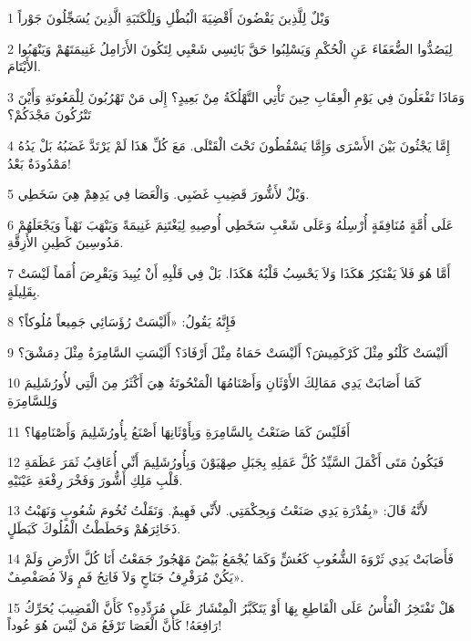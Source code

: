 \par 1 وَيْلٌ لِلَّذِينَ يَقْضُونَ أَقْضِيَةَ الْبُطْلِ وَلِلْكَتَبَةِ الَّذِينَ يُسَجِّلُونَ جَوْراً
\par 2 لِيَصُدُّوا الضُّعَفَاءَ عَنِ الْحُكْمِ وَيَسْلِبُوا حَقَّ بَائِسِي شَعْبِي لِتَكُونَ الأَرَامِلُ غَنِيمَتَهُمْ وَيَنْهَبُوا الأَيْتَامَ.
\par 3 وَمَاذَا تَفْعَلُونَ فِي يَوْمِ الْعِقَابِ حِينَ تَأْتِي التَّهْلُكَةُ مِنْ بَعِيدٍ؟ إِلَى مَنْ تَهْرُبُونَ لِلْمَعُونَةِ وَأَيْنَ تَتْرُكُونَ مَجْدَكُمْ؟
\par 4 إِمَّا يَجْثُونَ بَيْنَ الأَسْرَى وَإِمَّا يَسْقُطُونَ تَحْتَ الْقَتْلَى. مَعَ كُلِّ هَذَا لَمْ يَرْتَدَّ غَضَبُهُ بَلْ يَدُهُ مَمْدُودَةٌ بَعْدُ!
\par 5 وَيْلٌ لأَشُّورَ قَضِيبِ غَضَبِي. وَالْعَصَا فِي يَدِهِمْ هِيَ سَخَطِي.
\par 6 عَلَى أُمَّةٍ مُنَافِقَةٍ أُرْسِلُهُ وَعَلَى شَعْبِ سَخَطِي أُوصِيهِ لِيَغْتَنِمَ غَنِيمَةً وَيَنْهَبَ نَهْباً وَيَجْعَلَهُمْ مَدُوسِينَ كَطِينِ الأَزِقَّةِ.
\par 7 أَمَّا هُوَ فَلاَ يَفْتَكِرُ هَكَذَا وَلاَ يَحْسِبُ قَلْبُهُ هَكَذَا. بَلْ فِي قَلْبِهِ أَنْ يُبِيدَ وَيَقْرِضَ أُمَماً لَيْسَتْ بِقَلِيلَةٍ.
\par 8 فَإِنَّهُ يَقُولُ: «أَلَيْسَتْ رُؤَسَائِي جَمِيعاً مُلُوكاً؟
\par 9 أَلَيْسَتْ كَلْنُو مِثْلَ كَرْكَمِيشَ؟ أَلَيْسَتْ حَمَاةُ مِثْلَ أَرْفَادَ؟ أَلَيْسَتِ السَّامِرَةُ مِثْلَ دِمَشْقَ؟
\par 10 كَمَا أَصَابَتْ يَدِي مَمَالِكَ الأَوْثَانِ وَأَصْنَامُهَا الْمَنْحُوتَةُ هِيَ أَكْثَرُ مِنَ الَّتِي لأُورُشَلِيمَ وَلِلسَّامِرَةِ
\par 11 أَفَلَيْسَ كَمَا صَنَعْتُ بِالسَّامِرَةِ وَبِأَوْثَانِهَا أَصْنَعُ بِأُورُشَلِيمَ وَأَصْنَامِهَا؟
\par 12 فَيَكُونُ مَتَى أَكْمَلَ السَّيِّدُ كُلَّ عَمَلِهِ بِجَبَلِ صِهْيَوْنَ وَبِأُورُشَلِيمَ أَنِّي أُعَاقِبُ ثَمَرَ عَظَمَةِ قَلْبِ مَلِكِ أَشُّورَ وَفَخْرَ رِفْعَةِ عَيْنَيْهِ.
\par 13 لأَنَّهُ قَالَ: «بِقُدْرَةِ يَدِي صَنَعْتُ وَبِحِكْمَتِي. لأَنِّي فَهِيمٌ. وَنَقَلْتُ تُخُومَ شُعُوبٍ وَنَهَبْتُ ذَخَائِرَهُمْ وَحَطَطْتُ الْمُلُوكَ كَبَطَلٍ.
\par 14 فَأَصَابَتْ يَدِي ثَرْوَةَ الشُّعُوبِ كَعُشٍّ وَكَمَا يُجْمَعُ بَيْضٌ مَهْجُورٌ جَمَعْتُ أَنَا كُلَّ الأَرْضِ وَلَمْ يَكُنْ مُرَفْرِفُ جَنَاحٍ وَلاَ فَاتِحُ فَمٍ وَلاَ مُصَفْصِفٌ».
\par 15 هَلْ تَفْتَخِرُ الْفَأْسُ عَلَى الْقَاطِعِ بِهَا أَوْ يَتَكَبَّرُ الْمِنْشَارُ عَلَى مُرَدِّدِهِ؟ كَأَنَّ الْقَضِيبَ يُحَرِّكُ رَافِعَهُ! كَأَنَّ الْعَصَا تَرْفَعُ مَنْ لَيْسَ هُوَ عُوداً!

